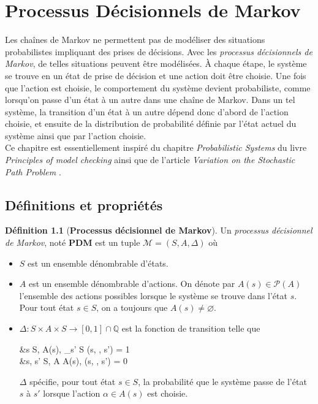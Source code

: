 \documentclass[12pt,a4paper]{report}
\theoremstyle{definition}%
\newtheorem{definition}{Définition}[chapter]
\theoremstyle{remark}
\let\labelitemi\labelitemii
\begin{document}
\chapter{Processus Décisionnels de Markov}

Les chaînes de Markov ne permettent pas de modéliser des situations probabilistes impliquant des prises de décisions. Avec les \textit{processus décisionnels de Markov}, de telles situations peuvent être modélisées. \`A chaque étape, le système se trouve en un état de prise de décision et une action doit être choisie. Une fois que l'action est choisie, le comportement du système devient probabiliste, comme lorsqu'on passe d'un état à un autre dans une chaîne de Markov. Dans un tel système, la transition d'un état à un autre dépend donc d'abord de l'action choisie, et ensuite de la distribution de probabilité définie par l'état actuel du système ainsi que par l'action choisie. \\

Ce chapitre est essentiellement inspiré du chapitre \textit{Probabilistic Systems} du livre \textit{Principles of model checking} \cite{DBLP:books/daglib/0020348} ainsi que de l'article \textit{Variation on
the Stochastic Path Problem} \cite{DBLP:journals/corr/RandourRS14a}.

\section{Définitions et propriétés}

\begin{definition}[\textbf{Processus décisionnel de Markov}]
	Un \textit{processus décisionnel de Markov}, noté \textbf{PDM} est un tuple $\mathcal{M}  = (S, A, \Delta)$ où
	\begin{itemize}
		\renewcommand{\labelitemi}{\tiny $\bullet$}
		\item $S$ est un ensemble dénombrable d'états.
		\item $A$ est un ensemble dénombrable d'actions. On dénote par $A(s) \in \mathcal{P}(A)$  l'ensemble des actions possibles lorsque le système se trouve dans l'état $s$. Pour tout état $s \in S$, on a toujours que $A(s) \neq \varnothing$.
		\item $\Delta: S \times A \times S \rightarrow [0, 1] \cap \mathbb{Q}$ est la fonction de transition telle que
		\begin{flalign*}
			&\forall s \in S, \; \forall \alpha \in A(s), \; \sum_{s' \in S} \Delta(s, \alpha, s') = 1 \\
			 &\forall s, s' \in S, \; \forall \alpha \in A \setminus A(s), \; \Delta(s, \alpha, s') = 0
		\end{flalign*}

			$\Delta$ spécifie, pour tout état $s \in S$, la probabilité que le système passe de l'état $s$ à $s'$ lorsque l'action $\alpha \in A(s)$ est choisie.
	\end{itemize}
\end{definition}
\end{document}
